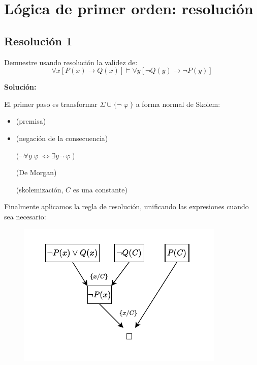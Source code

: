 \documentclass{article}
\begin{document}
\section{Lógica de primer orden: resolución}

\subsection{Resolución 1}
Demuestre usando resolución la validez de:
$$\forall x [P(x) \rightarrow Q(x)] \vDash \forall y [\neg Q(y) \rightarrow \neg P(y)]$$

\textbf{Solución:}

El primer paso es transformar $\Sigma \cup \{\neg \upvarphi\}$ a forma normal de Skolem:

\begin{itemize}

  \item{
        (premisa)}

  \item{
        (negación de la consecuencia)}

        {
        ($\neg \forall y \upvarphi \Leftrightarrow \exists y \neg \upvarphi$)}

        {
        (De Morgan)}

        {
        (skolemización, $C$ es una constante)}
\end{itemize}

Finalmente aplicamos la regla de resolución, unificando las expresiones cuando sea necesario:

\begin{figure}[H]
  \centering
  \includegraphics[width=.5\textwidth]{resolucion_lpo_01.pdf}
\end{figure}
\end{document}
